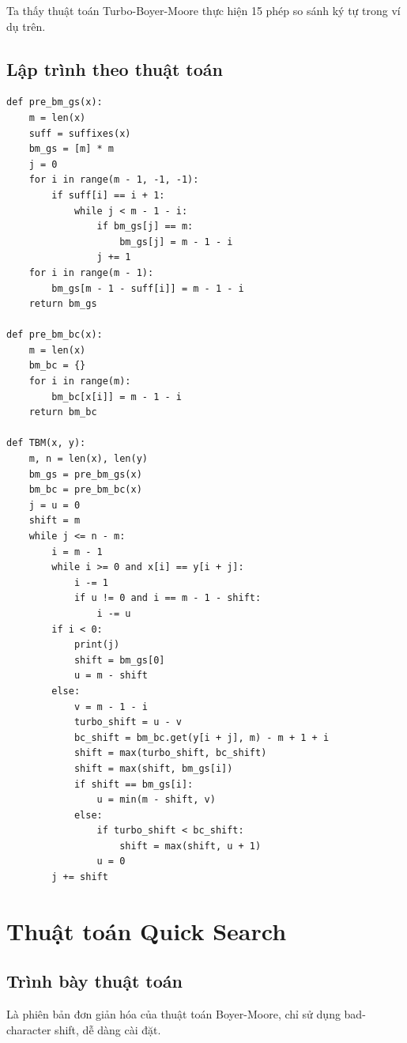 \documentclass[12pt,twoside,openright]{extreport}
\begin{document}
Ta thấy thuật toán Turbo-Boyer-Moore thực hiện 15 phép so sánh ký tự trong ví dụ trên.

\subsection{Lập trình theo thuật toán}

\begin{lstlisting}[style=PythonStyle]
def pre_bm_gs(x):
    m = len(x)
    suff = suffixes(x)
    bm_gs = [m] * m
    j = 0
    for i in range(m - 1, -1, -1):
        if suff[i] == i + 1:
            while j < m - 1 - i:
                if bm_gs[j] == m:
                    bm_gs[j] = m - 1 - i
                j += 1
    for i in range(m - 1):
        bm_gs[m - 1 - suff[i]] = m - 1 - i
    return bm_gs

def pre_bm_bc(x):
    m = len(x)
    bm_bc = {}
    for i in range(m):
        bm_bc[x[i]] = m - 1 - i
    return bm_bc

def TBM(x, y):
    m, n = len(x), len(y)
    bm_gs = pre_bm_gs(x)
    bm_bc = pre_bm_bc(x)
    j = u = 0
    shift = m
    while j <= n - m:
        i = m - 1
        while i >= 0 and x[i] == y[i + j]:
            i -= 1
            if u != 0 and i == m - 1 - shift:
                i -= u
        if i < 0:
            print(j)
            shift = bm_gs[0]
            u = m - shift
        else:
            v = m - 1 - i
            turbo_shift = u - v
            bc_shift = bm_bc.get(y[i + j], m) - m + 1 + i
            shift = max(turbo_shift, bc_shift)
            shift = max(shift, bm_gs[i])
            if shift == bm_gs[i]:
                u = min(m - shift, v)
            else:
                if turbo_shift < bc_shift:
                    shift = max(shift, u + 1)
                u = 0
        j += shift
\end{lstlisting}

\section{Thuật toán Quick Search}

\subsection{Trình bày thuật toán}

Là phiên bản đơn giản hóa của thuật toán Boyer-Moore, chỉ sử dụng bad-character shift, dễ dàng cài đặt.
\end{document}

